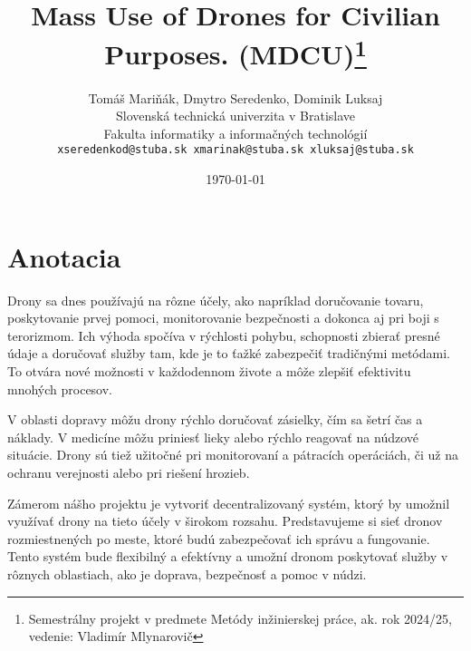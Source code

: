 \documentclass[10pt,a4paper]{article}
\title{Mass Use of Drones for Civilian Purposes. (\textbf{MDCU})\thanks{Semestrálny projekt v predmete Metódy inžinierskej práce, ak. rok 2024/25, vedenie: Vladimír Mlynarovič}}
\author{Tomáš Mariňák, Dmytro Seredenko, Dominik Luksaj\\[2pt]
	{\small Slovenská technická univerzita v Bratislave}\\
	{\small Fakulta informatiky a informačných technológií}\\
	{\small \texttt{xseredenkod@stuba.sk xmarinak@stuba.sk xluksaj@stuba.sk}}}
\date{\small \today}
\begin{document}
\maketitle

\section{Anotacia}

 Drony sa dnes používajú na rôzne účely, ako napríklad doručovanie tovaru, poskytovanie prvej pomoci, monitorovanie bezpečnosti a dokonca aj pri boji s terorizmom. Ich výhoda spočíva v rýchlosti pohybu, schopnosti zbierať presné údaje a doručovať služby tam, kde je to ťažké zabezpečiť tradičnými metódami. To otvára nové možnosti v každodennom živote a môže zlepšiť efektivitu mnohých procesov.

 V oblasti dopravy môžu drony rýchlo doručovať zásielky, čím sa šetrí čas a náklady. V medicíne môžu priniesť lieky alebo rýchlo reagovať na núdzové situácie. Drony sú tiež užitočné pri monitorovaní a pátracích operáciách, či už na ochranu verejnosti alebo pri riešení hrozieb.

 Zámerom nášho projektu je vytvoriť decentralizovaný systém, ktorý by umožnil využívať drony na tieto účely v širokom rozsahu. Predstavujeme si sieť dronov rozmiestnených po meste, ktoré budú zabezpečovať ich správu a fungovanie. Tento systém bude flexibilný a efektívny a umožní dronom poskytovať služby v rôznych oblastiach, ako je doprava, bezpečnosť a pomoc v núdzi.
\end{document}
